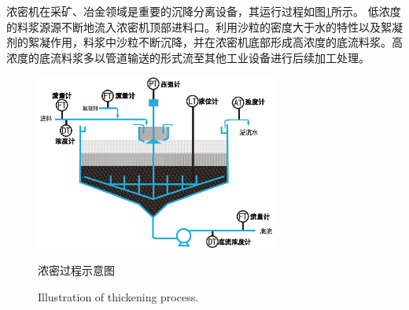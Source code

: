 浓密机在采矿、冶金领域是重要的沉降分离设备，其运行过程如图\ref{fig:thickener}所示。
低浓度的料浆源源不断地流入浓密机顶部进料口。利用沙粒的密度大于水的特性以及絮凝剂的絮凝作用，料浆中沙粒不断沉降，并在浓密机底部形成高浓度的底流料浆。高浓度的底流料浆多以管道输送的形式流至其他工业设备进行后续加工处理。
\begin{figure}[hpbt]
    \centering
    \includegraphics[width=8cm]{figures/chapter6/fig1.eps}
    \caption{浓密过程示意图}

  \addtocounter{figure}{-1}
  \vspace{-5pt}
  \renewcommand{\figurename}{Fig.}
  \caption{Illustration of thickening process.}
  \renewcommand{\figurename}{图}

    \label{fig:thickener}
\end{figure}


